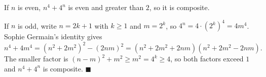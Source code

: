 If $n$ is even, $n^4+4^n$ is even and greater than $2$, so it is composite.

If $n$ is odd, write $n=2k+1$ with $k\ge1$ and $m=2^k$, so $4^n=4\cdot\left(2^k\right)^4=4m^4$. Sophie Germain's identity gives
\[n^4+4m^4=\left(n^2+2m^2\right)^2-(2nm)^2=\left(n^2+2m^2+2nm\right)\left(n^2+2m^2-2nm\right).\]
The smaller factor is $(n-m)^2+m^2\ge m^2=4^k\ge4$, so both factors exceed $1$ and $n^4+4^n$ is composite. $\blacksquare$
